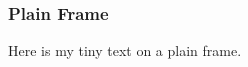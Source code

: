 %
\begin{frame}[plain]
    \frametitle{Plain Frame}
    \begin{center}
        Here is my tiny text on a plain frame.
    \end{center}
\end{frame}
